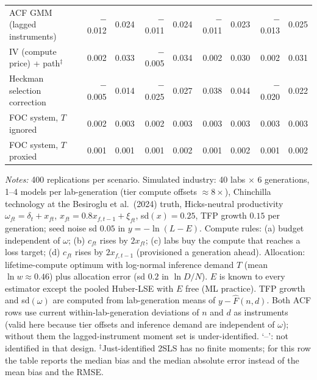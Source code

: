\begin{table}[!htbp]
\begin{threeparttable}
\begin{tabular}{lrrrrrrrr}
ACF GMM (lagged instruments) & $-$0.012 & 0.024 & $-$0.011 & 0.024 & $-$0.011 & 0.023 & $-$0.013 & 0.025 \\
IV (compute price) + path$^{\ddagger}$ & 0.002 & 0.033 & $-$0.005 & 0.034 & 0.002 & 0.030 & 0.002 & 0.031 \\
Heckman selection correction & $-$0.005 & 0.014 & $-$0.025 & 0.027 & 0.038 & 0.044 & $-$0.020 & 0.022 \\
FOC system, $T$ ignored & 0.002 & 0.003 & 0.002 & 0.003 & 0.003 & 0.003 & 0.003 & 0.003 \\
FOC system, $T$ proxied & 0.001 & 0.001 & 0.001 & 0.002 & 0.001 & 0.002 & 0.001 & 0.002 \\
\bottomrule
\end{tabular}
\begin{tablenotes}[flushleft]\footnotesize
\item \textit{Notes:} 400 replications per scenario. Simulated industry: 40 labs $\times$ 6 generations, 1--4 models per lab-generation (tier compute offsets $\approx 8\times$), Chinchilla technology at the Besiroglu et al.\ (2024) truth, Hicks-neutral productivity $\omega_{ft}=\delta_t+x_{ft}$, $x_{ft}=0.8x_{f,t-1}+\xi_{ft}$, sd$(x)=0.25$, TFP growth $0.15$ per generation; seed noise sd $0.05$ in $y=-\ln(L-E)$. Compute rules: (a) budget independent of $\omega$; (b) $c_{ft}$ rises by $2x_{ft}$; (c) labs buy the compute that reaches a loss target; (d) $c_{ft}$ rises by $2x_{f,t-1}$ (provisioned a generation ahead). Allocation: lifetime-compute optimum with log-normal inference demand $T$ (mean $\ln w\approx0.46$) plus allocation error (sd $0.2$ in $\ln D/N$). $E$ is known to every estimator except the pooled Huber-LSE with $E$ free (ML practice). TFP growth and sd$(\omega)$ are computed from lab-generation means of $y-\hat F(n,d)$. Both ACF rows use current within-lab-generation deviations of $n$ and $d$ as instruments (valid here because tier offsets and inference demand are independent of $\omega$); without them the lagged-instrument moment set is under-identified. `--': not identified in that design. $^{\ddagger}$Just-identified 2SLS has no finite moments; for this row the table reports the median bias and the median absolute error instead of the mean bias and the RMSE. 
\end{tablenotes}
\end{threeparttable}
\end{table}
